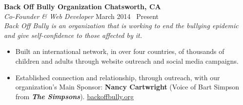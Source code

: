 {\bf Back Off Bully Organization \hfill Chatsworth, CA} \\
{\it Co-Founder \& Web Developer} \hfill March 2014 \textendash\ Present \\
{\sl Back Off Bully is an organization that is working to end the bullying epidemic and give self-confidence to those affected by it.}
\begin{itemize} \itemsep -2pt
	\item Built an international network, in over four countries, of thousands of children and adults through website outreach and social media campaigns. 
	\item Established connection and relationship, through outreach, with our organization's Main Sponsor: {\bf Nancy Cartwright} (Voice of Bart Simpson from {\bf \it The Simpsons}). \textcolor{RoyalBlue}{\href{https://backoffbully.org}{backoffbully.org}}
\end{itemize}